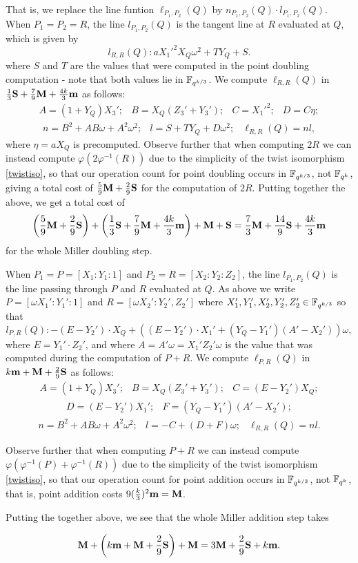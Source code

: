That is, we replace the line funtion $\ell_{P_1,P_2}(Q)$ by $n_{P_1,P_2}(Q) \cdot l_{P_1,P_2}(Q)$.
When $P_1 = P_2 = R$, the line $l_{P_1,P_2}(Q)$ is the tangent line at $R$ evaluated at $Q$, which is given by
\[l_{R,R}(Q): aX_1'^2 X_Q \omega^2 + T Y_Q + S.\]
where $S$ and $T$ are the values that were computed in the point doubling computation - note that
both values lie in $\mathbb{F}_{q^{k/3}}$.
We compute $\ell_{R,R}(Q)$ in 
$\frac{1}{3}\textbf{S} + \frac{7}{9}\textbf{M} + \frac{4k}{3}\textbf{m}$ as follows:
\[\begin{array}{cccc}
A = (1+Y_Q)X_3';&
 B = X_Q(Z_3' + Y_3'); &
 C = X_1'^2; &
 D = C\eta;
\end{array}\]
\[\begin{array}{ccc}
n = B^2 + AB \omega + A^2 \omega^2; &
l = S + TY_Q + D\omega^2; &
\ell_{R,R}(Q) = nl,
\end{array}\]
where $\eta = aX_Q$ is precomputed.
Observe further that when computing $2R$ we can instead compute
$\varphi(2\varphi^{-1}(R))$ due to the simplicity of the twist isomorphism \eqref{twistiso},
so that our operation count for point doubling occurs in $\mathbb{F}_{q^{k/3}}$, not $\mathbb{F}_{q^k}$, giving a total cost of $\frac{5}{9}\textbf{M} + \frac{2}{9}\textbf{S}$ for the computation of $2R$.
Putting together the above, we get a total cost of 
\[\left(\frac{5}{9}\textbf{M} + \frac{2}{9}\textbf{S}\right) + \left(\frac{1}{3}\textbf{S} + \frac{7}{9}\textbf{M} + \frac{4k}{3}\textbf{m} \right) + \textbf{M} + \textbf{S} = \frac{7}{3}\textbf{M} + \frac{14}{9}\textbf{S} + \frac{4k}{3}\textbf{m}\]
for the whole Miller doubling step.

When $P_1  = P = [X_1:Y_1:1]$ and $P_2 = R = [X_2:Y_2:Z_2]$, 
the line $l_{P_1,P_2}(Q)$ is the line passing through $P$ and $R$ evaluated at $Q$.
As above we write $P = [\omega X_1':Y_1':1]$ and 
$R = [\omega X_2': Y_2', Z_2']$ where $X_1',Y_1',X_2',Y_2',Z_2' \in \mathbb{F}_{q^{k/3}}$ 
so that
$$l_{P,R}(Q): - (E - Y_2') \cdot X_{Q} + ((E - Y_2') \cdot X_1' + (Y_{Q}-Y_1')(A'-X_2'))\omega, $$
where $E = Y_1' \cdot Z_2'$, and where $A = A'\omega = X_1'Z_2'\omega$ is the value that was computed during the computation of $P+R$.
We compute $\ell_{P,R}(Q)$ in
$k\textbf{m} + \textbf{M} + \frac{2}{9}\textbf{S}$
as follows:
\[\begin{array}{ccc}
A = (1+Y_Q)X_3';&
 B = X_Q(Z_3' + Y_3'); &
 C = (E-Y_2')X_Q;
\end{array}\]
\[\begin{array}{cc}
 D = (E-Y_2')X_1'; &
  F = (Y_Q-Y_1')(A'-X_2');
\end{array}\]
\[\begin{array}{ccc}
n = B^2 + AB \omega + A^2 \omega^2; &
l = -C + (D+F)\omega; &
\ell_{R,R}(Q) = nl.
\end{array}\]

Observe further that when computing $P+R$ we can instead compute
$\varphi(\varphi^{-1}(P) + \varphi^{-1}(R))$ due to the simplicity of the twist isomorphism \eqref{twistiso},
so that our operation count for point addition occurs in $\mathbb{F}_{q^{k/3}}$, not $\mathbb{F}_{q^k}$, that is,
point addition costs $9(\frac{k}{3})^2\textbf{m} = \textbf{M}$.

Putting the together above, we see that the whole Miller addition step takes

\[\textbf{M} + \left( k\textbf{m} + \textbf{M} + \frac{2}{9}\textbf{S} \right) + \textbf{M} = 3\textbf{M} + \frac{2}{9}\textbf{S} + k\textbf{m}.\]

